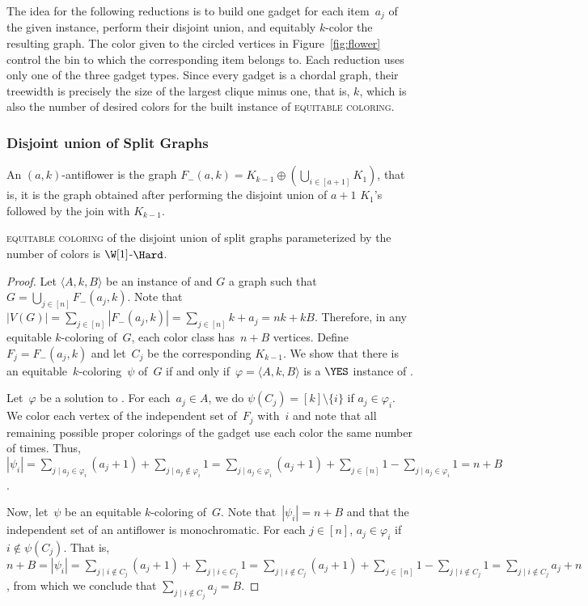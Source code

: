 The idea for the following reductions is to build one gadget for each item~$a_j$ of the given  instance, perform their disjoint union, and equitably $k$-color the resulting graph.
The color given to the circled vertices in Figure~\ref{fig:flower} control the bin to which the corresponding item belongs to.
Each reduction uses only one of the three gadget types.
Since every gadget is a chordal graph, their treewidth is precisely the size of the largest clique minus one, that is, $k$, which is also the number of desired colors for the built instance of \textsc{equitable coloring}.

\subsubsection{Disjoint union of Split Graphs}

\begin{definition}
    An $(a,k)$-antiflower is the graph $F_-(a,k) = K_{k-1} \oplus \left(\bigcup_{i \in [a+1]} K_1\right)$, that is, it is the graph obtained after performing the disjoint union of $a+1$ $K_1$'s followed by the join with $K_{k-1}$.
\end{definition}

\begin{theorem}
    \label{thm:dis_split}
    \textsc{equitable coloring} of the disjoint union of split graphs parameterized by the number of colors is $\W[1]$-$\Hard$.
\end{theorem}
\begin{proof}
    Let $\langle A,k,B\rangle$ be an instance of  and $G$ a graph such that~$G = \bigcup_{j \in [n]} F_-(a_j,k)$.
    Note that $|V(G)| = \sum_{j \in [n]} |F_-(a_j, k)| = \sum_{j \in [n]} k + a_j = nk + kB$.
    Therefore, in any equitable $k$-coloring of~$G$, each color class has~$n + B$ vertices.
    Define~$F_j = F_-(a_j,k)$ and let~$C_j$ be the corresponding $K_{k-1}$.
    We show that there is an equitable~$k$-coloring~$\psi$ of~$G$ if and only if~$\varphi = \langle A,k,B\rangle$ is a $\YES$ instance of .
    
    Let~$\varphi$ be a solution to .
    For each~$a_j \in A$, we do $\psi(C_j) = [k] \setminus \{i\}$ if $a_j \in \varphi_i$.
    We color each vertex of the independent set of~$F_{j}$ with~$i$ and note that all remaining possible proper colorings of the gadget use each color the same number of times.
    Thus, $|\psi_i| = \sum_{j \mid a_j \in \varphi_i} (a_j + 1) + \sum_{j \mid a_j \notin \varphi_i} 1 = \sum_{j \mid a_j \in \varphi_i} (a_j + 1) + \sum_{j \in [n]} 1 - \sum_{j \mid a_j \in \varphi_i} 1 = n + B$.
    
    Now, let~$\psi$ be an equitable $k$-coloring of~$G$.
    Note that~$|\psi_i| = n+B$ and that the independent set of an antiflower is monochromatic.
    For each $j \in [n]$, $a_j \in \varphi_i$ if $i \notin \psi(C_j)$.
    That is, $n + B = |\psi_i| = \sum_{j \mid i \notin C_j} (a_j + 1) + \sum_{j \mid i \in C_j} 1 = \sum_{j \mid i \notin C_j} (a_j + 1) + \sum_{j \in [n]} 1 - \sum_{j \mid i \notin C_j} 1 = \sum_{j \mid i \notin C_j} a_j + n$, from which we conclude that $\sum_{j \mid i \notin C_j} a_j = B$.
\end{proof}

